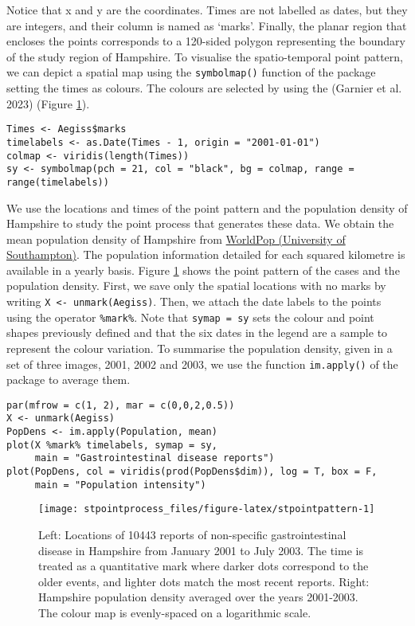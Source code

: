 Notice that x and y are the coordinates. Times are not labelled as dates, but they are integers, and their column is named as `marks'. Finally, the planar region that encloses the points corresponds to a 120-sided polygon representing the boundary of the study region of Hampshire. To visualise the spatio-temporal point pattern, we can depict a spatial map using the \texttt{symbolmap()} function of the  package setting the times as colours. The colours are selected by using the  (Garnier et al. 2023) (Figure \ref{fig:stpointpattern}).

\begin{verbatim}
Times <- Aegiss$marks
timelabels <- as.Date(Times - 1, origin = "2001-01-01")
colmap <- viridis(length(Times))
sy <- symbolmap(pch = 21, col = "black", bg = colmap, range = range(timelabels))
\end{verbatim}

We use the locations and times of the point pattern and the population density of Hampshire to study the point process that generates these data. We obtain the mean population density of Hampshire from \href{https://www.worldpop.org/}{WorldPop (University of Southampton)}. The population information detailed for each squared kilometre is available in a yearly basis. Figure \ref{fig:stpointpattern} shows the point pattern of the cases and the population density. First, we save only the spatial locations with no marks by writing \texttt{X\ \textless{}-\ unmark(Aegiss)}. Then, we attach the date labels to the points using the operator \texttt{\%mark\%}. Note that \texttt{symap\ =\ sy} sets the colour and point shapes previously defined and that the six dates in the legend are a sample to represent the colour variation. To summarise the population density, given in a set of three images, 2001, 2002 and 2003, we use the function \texttt{im.apply()} of the package  to average them.

\begin{verbatim}
par(mfrow = c(1, 2), mar = c(0,0,2,0.5)) 
X <- unmark(Aegiss)
PopDens <- im.apply(Population, mean)
plot(X %mark% timelabels, symap = sy, 
     main = "Gastrointestinal disease reports")
plot(PopDens, col = viridis(prod(PopDens$dim)), log = T, box = F,
     main = "Population intensity")
\end{verbatim}

\begin{figure}

{\centering \texttt{[image: stpointprocess\_files/figure-latex/stpointpattern-1]} 

}

\caption{Left: Locations of 10443 reports of non-specific gastrointestinal disease in Hampshire from January 2001 to July 2003. The time is treated as a quantitative mark where darker dots correspond to the older events, and lighter dots match the most recent reports. Right: Hampshire population density averaged over the years 2001-2003. The colour map is evenly-spaced on a logarithmic scale.}\label{fig:stpointpattern}
\end{figure}

